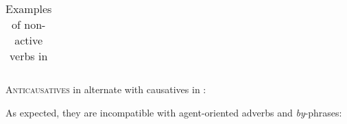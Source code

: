 \begin{exe}
\begin{xlist}
\begin{xlist}
\begin{exe}
\begin{xlist}
\begin{xlist}
\begin{exe}
\begin{xlist}
\begin{xlist}
\begin{exe}
\begin{exe}
\begin{xlist}
\begin{exe}
\begin{exe}
\begin{xlist}
\begin{exe}
\begin{exe}
\begin{exe}
\begin{exe}
\begin{exe}
\begin{xlist}
\begin{exe}
\begin{xlist}
\begin{exe}
\begin{exe}
\begin{xlist}
\begin{exe}
\begin{xlist}
\begin{exe}
\begin{exe}
\begin{exe}
\begin{xlist}
\begin{exe}
\begin{exe}
\begin{exe}
\begin{xlist}
\begin{exe}
\begin{xlist}
\begin{exe}
\begin{xlist}
\begin{exe}
\begin{xlist}
\begin{exe}
\begin{exe}
\begin{exe}
\begin{exe}
\begin{xlist}
\begin{exe}
\begin{xlist}
\begin{exe}
\begin{xlist}
\begin{exe}
\begin{xlist}
\begin{exe}
\begin{xlist}
\begin{exe}
\begin{xlist}
\begin{exe}
\begin{exe}
\begin{exe}
\begin{exe}
\begin{xlist}
\begin{exe}
\begin{xlist}
\begin{exe}
\begin{xlist}
\begin{exe}
\begin{table}
\begin{tabularx}{\textwidth}{lc>{\em}ll>{\em}ll}
 \end{tabularx}
	\caption{Examples of non-active verbs in {\thit}}
\label{tab:3-6:thit}
\end{table}

\textsc{Anticausatives} in {\thit} alternate with causatives in {\tpie}:
 \begin{exe}
 \ex \label{ex:vz:anticaus-va}
 \begin{xlist} 
	
	
	
 \z
\z 

As expected, they are incompatible with agent-oriented adverbs and \emph{by}-phrases:
 \begin{exe}
	
 \z 


\end{exe}
\end{xlist}
\end{exe}
\end{exe}
\end{xlist}
\end{exe}
\end{xlist}
\end{exe}
\end{xlist}
\end{exe}
\end{exe}
\end{exe}
\end{exe}
\end{xlist}
\end{exe}
\end{xlist}
\end{exe}
\end{xlist}
\end{exe}
\end{xlist}
\end{exe}
\end{xlist}
\end{exe}
\end{xlist}
\end{exe}
\end{exe}
\end{exe}
\end{exe}
\end{xlist}
\end{exe}
\end{xlist}
\end{exe}
\end{xlist}
\end{exe}
\end{xlist}
\end{exe}
\end{exe}
\end{exe}
\end{xlist}
\end{exe}
\end{exe}
\end{exe}
\end{xlist}
\end{exe}
\end{xlist}
\end{exe}
\end{exe}
\end{xlist}
\end{exe}
\end{xlist}
\end{exe}
\end{exe}
\end{exe}
\end{exe}
\end{exe}
\end{xlist}
\end{exe}
\end{exe}
\end{xlist}
\end{exe}
\end{exe}
\end{xlist}
\end{xlist}
\end{exe}
\end{xlist}
\end{xlist}
\end{exe}
\end{xlist}
\end{xlist}
\end{exe}
